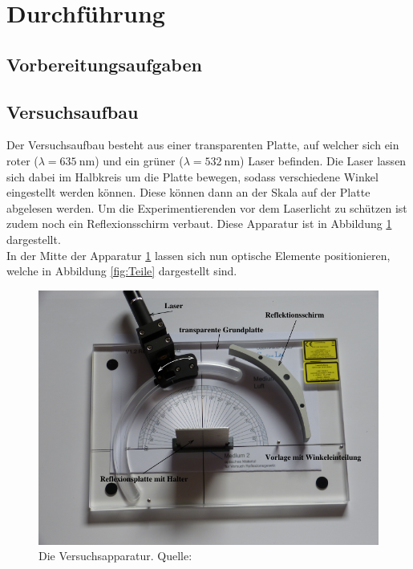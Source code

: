 \section{Durchführung}
\label{sec:Durchführung}

\subsection{Vorbereitungsaufgaben}
\label{sec:vorbereitung}

\subsection{Versuchsaufbau}
\label{sec:aufbau}
Der Versuchsaufbau besteht aus einer transparenten Platte, auf welcher sich ein roter
($\lambda=\SI{635}{\nano\metre}$) und ein grüner ($\lambda=\SI{532}{\nano\metre}$) Laser
befinden. Die Laser lassen sich dabei im Halbkreis um die Platte bewegen, sodass verschiedene
Winkel eingestellt werden können. Diese können dann an der Skala auf der Platte abgelesen werden.
Um die Experimentierenden vor dem Laserlicht zu schützen ist zudem noch ein Reflexionsschirm
verbaut. Diese Apparatur ist in Abbildung \ref{fig:Aufbau} dargestellt.
\\\noindent
In der Mitte der Apparatur \ref{fig:Aufbau} lassen sich nun optische Elemente positionieren, welche
in Abbildung \ref{fig:Teile} dargestellt sind.
\begin{figure}[H]
    \centering
    \includegraphics[scale = 0.3]{pictures/Aufbau.png}
    \caption{Die Versuchsapparatur. Quelle: \cite{AP01}}
    \label{fig:Aufbau}
\end{figure}
